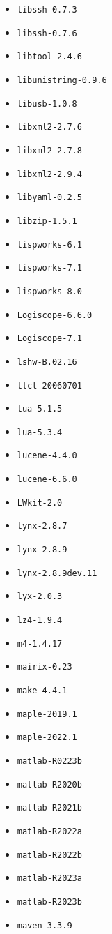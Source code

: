\begin{multicols}{3}
\begin{itemize}
\item \verb|libssh-0.7.3|
\item \verb|libssh-0.7.6|
\item \verb|libtool-2.4.6|
\item \verb|libunistring-0.9.6|
\item \verb|libusb-1.0.8|
\item \verb|libxml2-2.7.6|
\item \verb|libxml2-2.7.8|
\item \verb|libxml2-2.9.4|
\item \verb|libyaml-0.2.5|
\item \verb|libzip-1.5.1|
\item \verb|lispworks-6.1|
\item \verb|lispworks-7.1|
\item \verb|lispworks-8.0|
\item \verb|Logiscope-6.6.0|
\item \verb|Logiscope-7.1|
\item \verb|lshw-B.02.16|
\item \verb|ltct-20060701|
\item \verb|lua-5.1.5|
\item \verb|lua-5.3.4|
\item \verb|lucene-4.4.0|
\item \verb|lucene-6.6.0|
\item \verb|LWkit-2.0|
\item \verb|lynx-2.8.7|
\item \verb|lynx-2.8.9|
\item \verb|lynx-2.8.9dev.11|
\item \verb|lyx-2.0.3|
\item \verb|lz4-1.9.4|
\item \verb|m4-1.4.17|
\item \verb|mairix-0.23|
\item \verb|make-4.4.1|
\item \verb|maple-2019.1|
\item \verb|maple-2022.1|
\item \verb|matlab-R0223b|
\item \verb|matlab-R2020b|
\item \verb|matlab-R2021b|
\item \verb|matlab-R2022a|
\item \verb|matlab-R2022b|
\item \verb|matlab-R2023a|
\item \verb|matlab-R2023b|
\item \verb|maven-3.3.9|

\end{itemize}
\end{multicols}
